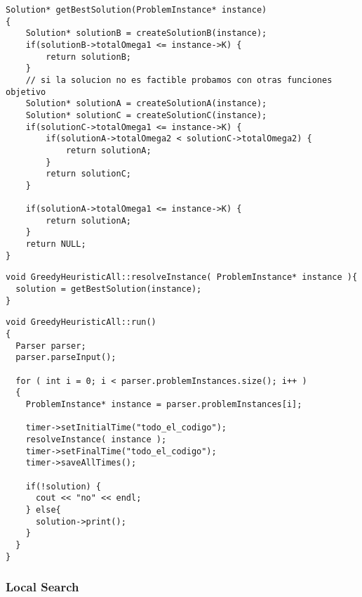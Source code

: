 \begin{lstlisting}[caption=getBestSolution()]
Solution* getBestSolution(ProblemInstance* instance) 
{
    Solution* solutionB = createSolutionB(instance);    
    if(solutionB->totalOmega1 <= instance->K) {
        return solutionB;
    }
    // si la solucion no es factible probamos con otras funciones objetivo    
    Solution* solutionA = createSolutionA(instance);
    Solution* solutionC = createSolutionC(instance);
    if(solutionC->totalOmega1 <= instance->K) {
        if(solutionA->totalOmega2 < solutionC->totalOmega2) {            
            return solutionA;
        }         
        return solutionC;
    }    
        
    if(solutionA->totalOmega1 <= instance->K) {
        return solutionA;
    }
    return NULL;   
}
\end{lstlisting}
\begin{lstlisting}[caption=GreedyHeuristicAll::resolveInstance()]
void GreedyHeuristicAll::resolveInstance( ProblemInstance* instance ){
  solution = getBestSolution(instance);
}
\end{lstlisting}
\begin{lstlisting}[caption=GreedyHeuristicAll::run()]
void GreedyHeuristicAll::run()
{
  Parser parser;
  parser.parseInput();

  for ( int i = 0; i < parser.problemInstances.size(); i++ )
  {
    ProblemInstance* instance = parser.problemInstances[i];
    
    timer->setInitialTime("todo_el_codigo");
    resolveInstance( instance );       
    timer->setFinalTime("todo_el_codigo");
    timer->saveAllTimes();
    
    if(!solution) {
      cout << "no" << endl;
    } else{
      solution->print();
    }    
  }
}
\end{lstlisting}

\subsubsection{Local Search}

